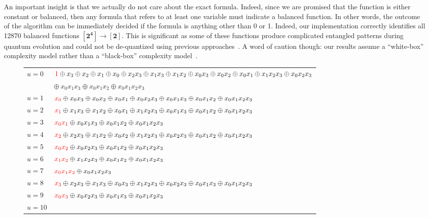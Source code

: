 \documentclass[sigplan,review]{acmart}
\newcommand{\finset}[1]{[\mathbf{#1}]}
\newcommand{\red}[1]{{\color{red}{#1}}}
\begin{document}
An important insight is that we actually do not care about the exact
formula. Indeed, since we are promised that the function is either
constant or balanced, then any formula that refers to at least one
variable must indicate a balanced function. In other words, the
outcome of the algorithm can be immediately decided if the formula is
anything other than 0 or 1. Indeed, our implementation correctly
identifies all 12870 balanced functions $\finset{2^4} \rightarrow
\finset{2}$. This is significant as some of these functions produce
complicated entangled patterns during quantum evolution and could not
be de-quantized using previous approaches~\cite{djdeq}. A word of
caution though: our results assume a ``white-box'' complexity model
rather than a ``black-box'' complexity model~\cite{10.1145/3341106}.

\begin{figure*}
\begin{tabular}{ll}
$u=0$ & 
  $\red{1} \oplus x_3 \oplus x_2 \oplus x_1 \oplus x_0 \oplus x_2x_3 \oplus x_1x_3 \oplus x_1x_2 \oplus x_0x_3 \oplus x_0x_2 \oplus x_0x_1 \oplus x_1x_2x_3 \oplus x_0x_2x_3$ \\
   &\quad $\oplus ~x_0x_1x_3 \oplus x_0x_1x_2 \oplus x_0x_1x_2x_3$ \\
$u=1$ & 
  $\red{x_0} \oplus x_0x_3 \oplus x_0x_2 \oplus x_0x_1 \oplus x_0x_2x_3 \oplus x_0x_1x_3 \oplus x_0x_1x_2 \oplus x_0x_1x_2x_3$ \\
$u=2$ &
  $\red{x_1} \oplus x_1x_3 \oplus x_1x_2 \oplus x_0x_1 \oplus x_1x_2x_3 \oplus x_0x_1x_3 \oplus x_0x_1x_2 \oplus x_0x_1x_2x_3$ \\
$u=3$ &
  $\red{x_0x_1} \oplus x_0x_1x_3 \oplus x_0x_1x_2 \oplus x_0x_1x_2x_3$ \\
$u=4$ &
  $\red{x_2} \oplus x_2x_3 \oplus x_1x_2 \oplus x_0x_2 \oplus x_1x_2x_3 \oplus x_0x_2x_3 \oplus x_0x_1x_2 \oplus x_0x_1x_2x_3$ \\
$u=5$ &
  $\red{x_0x_2} \oplus x_0x_2x_3 \oplus x_0x_1x_2 \oplus x_0x_1x_2x_3$ \\
$u=6$ &
  $\red{x_1x_2} \oplus x_1x_2x_3 \oplus x_0x_1x_2 \oplus x_0x_1x_2x_3$ \\
$u=7$ &
  $\red{x_0x_1x_2} \oplus x_0x_1x_2x_3$ \\
$u=8$ &
  $\red{x_3} \oplus x_2x_3 \oplus x_1x_3 \oplus x_0x_3 \oplus x_1x_2x_3 \oplus x_0x_2x_3 \oplus x_0x_1x_3 \oplus x_0x_1x_2x_3$ \\
$u=9$ &
  $\red{x_0x_3} \oplus x_0x_2x_3 \oplus x_0x_1x_3 \oplus x_0x_1x_2x_3$ \\
$u=10$ &

\end{tabular}
\end{figure*}
\end{document}

